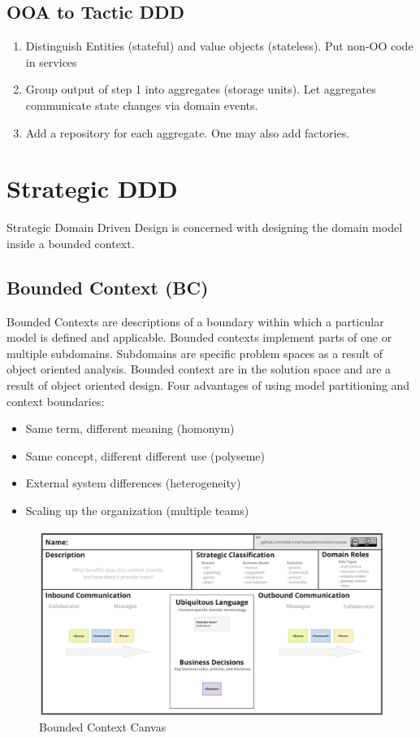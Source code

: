 \documentclass[../Main.tex]{subfiles}
\begin{document}
\subsection{OOA to Tactic DDD}
\begin{enumerate}
    \item Distinguish Entities (stateful) and value objects (stateless). Put non-OO code in services
    \item Group output of step 1 into aggregates (storage units). Let aggregates communicate state changes via domain events.
    \item Add a repository for each aggregate. One may also add factories.
\end{enumerate}

\section{Strategic DDD}
Strategic Domain Driven Design is concerned with designing the domain
model inside a bounded context.

\subsection{Bounded Context (BC)}
Bounded Contexts are descriptions of a boundary within which a particular model
is defined and applicable.
Bounded contexts implement parts of one or multiple subdomains.
Subdomains are specific problem spaces as a result of object oriented analysis.
Bounded context are in the solution space and are a result of object oriented design.
Four advantages of using model partitioning and context boundaries:
\begin{itemize}
    \item Same term, different meaning (homonym)
    \item Same concept, different different use (polyseme)
    \item External system differences (heterogeneity)
    \item Scaling up the organization (multiple teams)
\end{itemize}

\begin{figure}[H]
    \centering
    \includegraphics[width=1\linewidth]{Images/bounded-context-canvas.png}
    \caption{Bounded Context Canvas}
\end{figure}
\end{document}
